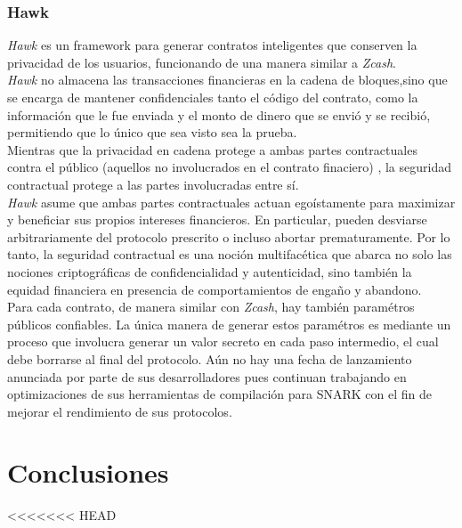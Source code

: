 \documentclass[oneside,10pt]{article}
\begin{document}
\subsubsection{Hawk}
\emph{Hawk} es un framework para generar contratos inteligentes que conserven la privacidad de los usuarios, funcionando de una manera similar a \emph{Zcash}. \\
\emph{Hawk} no almacena las transacciones financieras en la cadena de bloques,sino que se encarga de mantener confidenciales tanto el código del contrato, como la información que le fue enviada y el monto de dinero que se envió y se recibió, permitiendo que lo único que sea visto sea la prueba. \\
Mientras que la privacidad en cadena protege a ambas partes contractuales contra el público (aquellos no involucrados en el contrato finaciero) , la seguridad contractual protege a las partes involucradas entre sí.\\
\emph{Hawk} asume que ambas partes contractuales actuan egoístamente para maximizar y beneficiar sus propios intereses financieros. En particular, pueden desviarse arbitrariamente del protocolo prescrito o incluso abortar prematuramente. Por lo tanto, la seguridad contractual es una noción multifacética que abarca no solo las nociones criptográficas de confidencialidad y autenticidad, sino también la equidad financiera en presencia de comportamientos de engaño y abandono. \\
Para cada contrato, de manera similar con \emph{Zcash}, hay también paramétros públicos confiables. La única manera de generar estos paramétros es mediante un proceso que involucra generar un valor secreto en cada paso intermedio, el cual debe borrarse al final del protocolo. 
Aún no hay una fecha de lanzamiento anunciada por parte de sus desarrolladores pues continuan trabajando en optimizaciones de sus herramientas de compilación para SNARK con el fin de mejorar el rendimiento de sus protocolos.
\section{Conclusiones}
<<<<<<< HEAD
\end{document}
